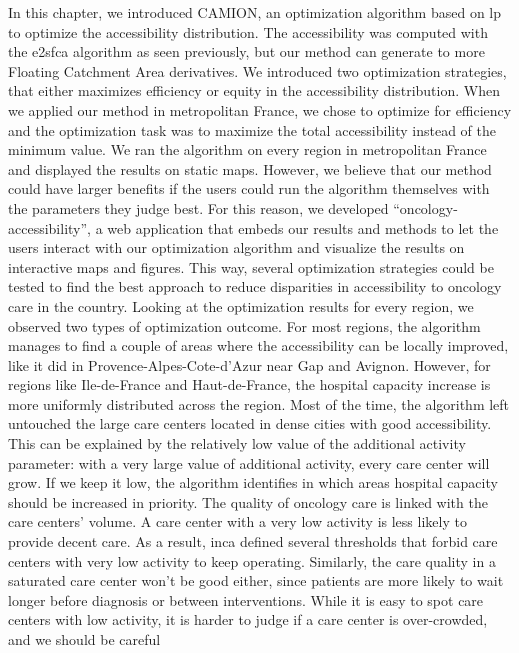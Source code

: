 In this chapter, we introduced CAMION, an optimization algorithm based on
\acf{lp} to optimize the accessibility distribution. The accessibility was
computed with the \acf{e2sfca} algorithm as seen previously, but our method can
generate to more Floating Catchment Area derivatives. We introduced two
optimization strategies, that either maximizes efficiency or equity in the
accessibility distribution. When we applied our method in metropolitan France,
we chose to optimize for efficiency and the optimization task was to maximize
the total accessibility instead of the minimum value. We ran the algorithm on
every region in metropolitan France and displayed the results on static maps.
However, we believe that our method could have larger benefits if the users
could run the algorithm themselves with the parameters they judge best. For this
reason, we developed ``oncology-accessibility'', a web application that embeds
our results and methods to let the users interact with our optimization
algorithm and visualize the results on interactive maps and figures. This way,
several optimization strategies could be tested to find the best approach to
reduce disparities in accessibility to oncology care in the country. Looking at
the optimization results for every region, we observed two types of optimization
outcome. For most regions, the algorithm manages to find a couple of areas where
the accessibility can be locally improved, like it did in
Provence-Alpes-Cote-d'Azur near Gap and Avignon. However, for regions like
Ile-de-France and Haut-de-France, the hospital capacity increase is more
uniformly distributed across the region. Most of the time, the algorithm left
untouched the large care centers located in dense cities with good
accessibility. This can be explained by the relatively low value of the
additional activity parameter: with a very large value of additional activity,
every care center will grow. If we keep it low, the algorithm identifies in
which areas hospital capacity should be increased in priority. The quality of
oncology care is linked with the care centers' volume. A care center with a very
low activity is less likely to provide decent care. As a result, \ac{inca}
defined several thresholds that forbid care centers with very low activity to
keep operating. Similarly, the care quality in a saturated care center won't be
good either, since patients are more likely to wait longer before diagnosis or
between interventions. While it is easy to spot care centers with low activity,
it is harder to judge if a care center is over-crowded, and we should be careful

